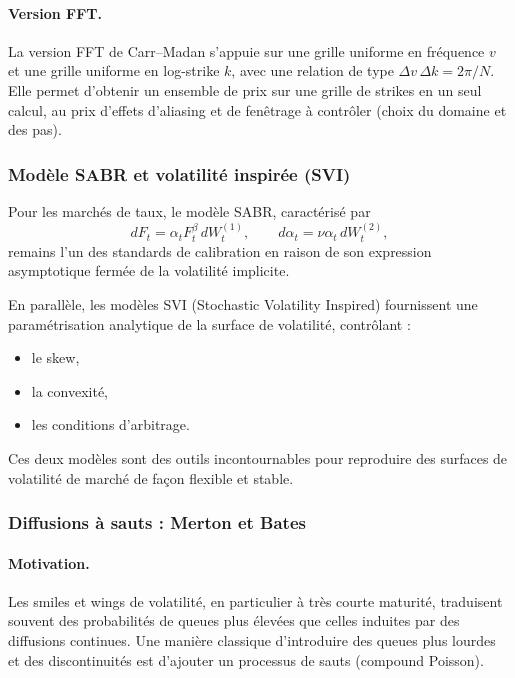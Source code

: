 \documentclass[11pt,a4paper]{article}
\newcommand{\1}{\mathbf{1}}
\begin{document}
\paragraph{Version FFT.}
La version FFT de Carr--Madan s'appuie sur une grille uniforme en fr\'equence $v$ et une grille uniforme en log-strike $k$,
avec une relation de type $\Delta v\,\Delta k = 2\pi/N$. Elle permet d'obtenir un ensemble de prix sur une grille de strikes en un seul
calcul, au prix d'effets d'aliasing et de fen\^etrage \`a contr\^oler (choix du domaine et des pas).
\endgroup
\subsubsection{Mod\`ele SABR et volatilité inspirée (SVI)}

Pour les marchés de taux, le mod\`ele SABR, caractérisé par
\[
dF_t = \alpha_t F_t^\beta\, dW_t^{(1)},
\qquad
d\alpha_t = \nu \alpha_t\, dW_t^{(2)},
\]
remains l'un des standards de calibration en raison de son expression
asymptotique fermée de la volatilité implicite.

En parall\`ele, les mod\`eles SVI (Stochastic Volatility Inspired) fournissent une
paramétrisation analytique de la surface de volatilité, contr\^olant :
\begin{itemize}
  \item le skew,
  \item la convexité,
  \item les conditions d'arbitrage.
\end{itemize}

Ces deux mod\`eles sont des outils incontournables pour reproduire des surfaces
de volatilité de marché de façon flexible et stable.

\subsubsection{Diffusions \`a sauts : Merton et Bates}

\paragraph{Motivation.}
Les smiles et wings de volatilité, en particulier \`a tr\`es courte maturit\'e, traduisent souvent des probabilit\'es
de queues plus \'elev\'ees que celles induites par des diffusions continues. Une mani\`ere classique d'introduire
des queues plus lourdes et des discontinuit\'es est d'ajouter un processus de sauts (compound Poisson).
\end{document}
